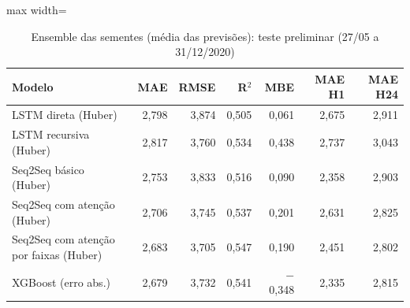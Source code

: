 \begin{table}[!htbp]
    \centering
    \caption{Ensemble das sementes (média das previsões): teste preliminar (27/05 a 31/12/2020)}
    \label{tab:ensemble_teste_historico}
    \small
    \begin{adjustbox}{max width=\textwidth}
    \begin{tabular}{lrrrrrr}
        \toprule
        Modelo & MAE & RMSE & R$^2$ & MBE & MAE H1 & MAE H24 \\
        \midrule
        LSTM direta (Huber) & 2,798 & 3,874 & 0,505 & 0,061 & 2,675 & 2,911 \\
        LSTM recursiva (Huber) & 2,817 & 3,760 & 0,534 & 0,438 & 2,737 & 3,043 \\
        Seq2Seq básico (Huber) & 2,753 & 3,833 & 0,516 & 0,090 & 2,358 & 2,903 \\
        Seq2Seq com atenção (Huber) & 2,706 & 3,745 & 0,537 & 0,201 & 2,631 & 2,825 \\
        Seq2Seq com atenção por faixas (Huber) & 2,683 & 3,705 & 0,547 & 0,190 & 2,451 & 2,802 \\
        XGBoost (erro abs.) & 2,679 & 3,732 & 0,541 & $-$0,348 & 2,335 & 2,815 \\
        \bottomrule
    \end{tabular}
    \end{adjustbox}
\end{table}
